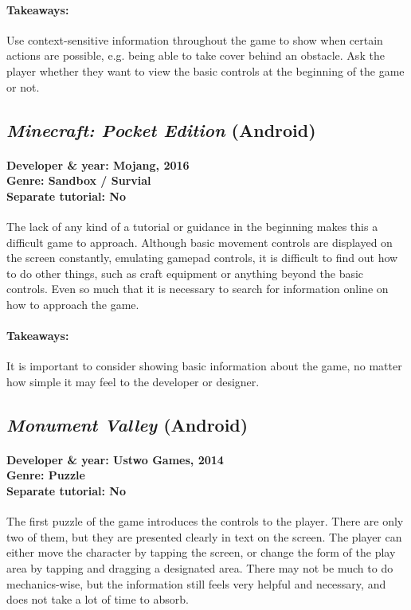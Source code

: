 \paragraph{Takeaways:}
Use context-sensitive information throughout the game to show when certain actions are possible, e.g. being able to take cover behind an obstacle. Ask the player whether they want to view the basic controls at the beginning of the game or not.

\subsection{\textit{Minecraft: Pocket Edition } (Android)}
\paragraph{Developer \& year: Mojang, 2016 \\ Genre: Sandbox / Survial \\ Separate tutorial: No \\}
The lack of any kind of a tutorial or guidance in the beginning makes this a difficult game to approach. Although basic movement controls are displayed on the screen constantly, emulating gamepad controls, it is difficult to find out how to do other things, such as craft equipment or anything beyond the basic controls. Even so much that it is necessary to search for information online on how to approach the game. 
\paragraph{Takeaways:}
It is important to consider showing basic information about the game, no matter how simple it may feel to the developer or designer.

\subsection{\textit{Monument Valley } (Android)}
\paragraph{Developer \& year: Ustwo Games, 2014 \\ Genre: Puzzle \\ Separate tutorial: No \\}
The first puzzle of the game introduces the controls to the player. There are only two of them, but they are presented clearly in text on the screen. The player can either move the character by tapping the screen, or change the form of the play area by tapping and dragging a designated area. There may not be much to do mechanics-wise, but the information still feels very helpful and necessary, and does not take a lot of time to absorb.
